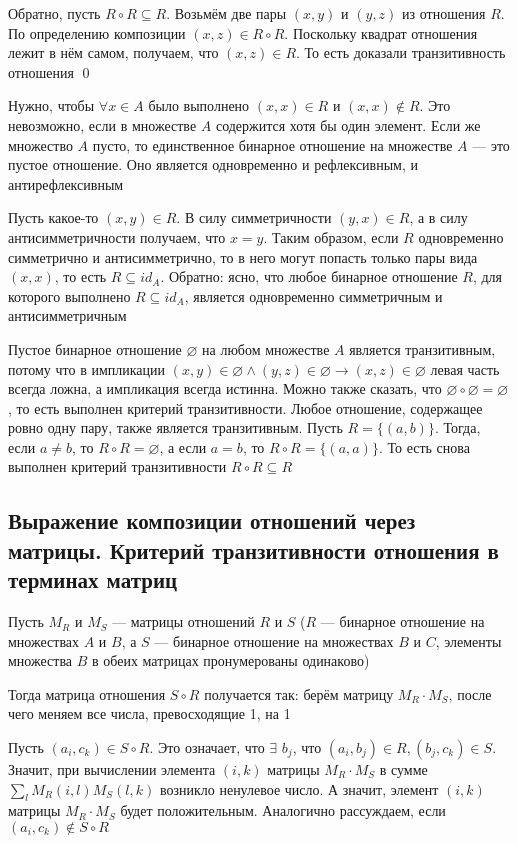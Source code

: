 \documentclass[a4paper]{article}
\begin{document}
Обратно, пусть $R\circ R\subseteq R$. Возьмём две пары $(x, y)$ и $(y, z)$ из отношения $R$. По определению композиции $(x, z)\in R\circ R$. Поскольку квадрат отношения лежит в нём самом, получаем, что $(x, z)\in R$. То есть доказали транзитивность отношения \qed

\ex Нужно, чтобы $\forall x\in A$ было выполнено $(x, x)\in R$ и $(x, x)\notin R$. Это невозможно, если в множестве $A$ содержится хотя бы один элемент. Если же множество $A$ пусто, то единственное бинарное отношение на множестве $A$ — это пустое отношение. Оно является одновременно и рефлексивным, и антирефлексивным

\ex Пусть какое-то $(x, y)\in R$. В силу симметричности $(y, x)\in R$, а в силу антисимметричности получаем, что $x=y$. Таким образом, если $R$ одновременно симметрично и антисимметрично, то в него могут попасть только пары вида $(x, x)$, то есть $R\subseteq id_A$. Обратно: ясно, что любое бинарное отношение $R$, для которого выполнено $R\subseteq id_A$, является одновременно симметричным и антисимметричным

\ex Пустое бинарное отношение $\varnothing$ на любом множестве $A$ является транзитивным, потому что в импликации $(x,y)\in\varnothing\wedge(y,z)\in\varnothing\rightarrow(x,z)\in\varnothing$ левая часть всегда ложна, а импликация всегда истинна. Можно также сказать, что $\varnothing\circ\varnothing = \varnothing$, то есть выполнен критерий транзитивности. Любое отношение, содержащее ровно одну пару, также является транзитивным. Пусть $R = \{(a, b)\}$. Тогда, если $a\ne b$, то $R\circ R = \varnothing$, а если $a = b$, то $R\circ R = \{(a, a)\}$. То есть снова выполнен критерий транзитивности $R\circ R\subseteq R$


\subsection{Выражение композиции отношений через матрицы. Критерий транзитивности отношения в терминах матриц}
Пусть $M_{R}$ и $M_{S}$ — матрицы отношений $R$ и $S$ ($R$ — бинарное отношение на множествах $A$ и $B$, а  $S$ — бинарное отношение на множествах $B$ и $C$, элементы множества $B$ в обеих матрицах пронумерованы одинаково)

Тогда матрица отношения $S \circ R$ получается так: берём матрицу $M_{R} \cdot M_{S}$, после чего меняем все числа, превосходящие 1, на 1

Пусть $\left(a_{i}, c_{k}\right) \in S \circ R$. Это означает, что $\exists$ $b_{j}$, что $\left(a_{i}, b_{j}\right) \in R,\left(b_{j}, c_{k}\right) \in S$. Значит, при вычислении элемента $(i, k)$ матрицы $M_{R} \cdot M_{S}$ в сумме $\sum_{l} M_{R}(i, l) M_{S}(l, k)$ возникло ненулевое число. А значит, элемент $(i, k)$ матрицы $M_{R} \cdot M_{S}$ будет положительным. Аналогично рассуждаем, если $\left(a_{i}, c_{k}\right) \notin S \circ R$
\end{document}
